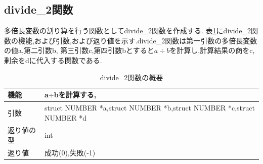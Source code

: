 \documentclass[a4j] {jarticle}
\begin{document}
\subsection{divide\_2関数}
多倍長変数の割り算を行う関数としてdivide\_2関数を作成する.
表\ref{divide_2}にdivide\_2関数の機能,および引数,および返り値を示す.divide\_2関数は第一引数の多倍長変数の値a,第二引数b,
第三引数c,第四引数bとすると$a\div b$を計算し,計算結果の商をc,剰余をdに代入する関数である.
\begin{table}[H]
  \caption{divide\_2関数の概要}
  \label{divide_2}
  \begin{center}
      \begin{tabular}{|l|l|}\hline
      機能 & a$\div$bを計算する,\\ \hline
      引数 & struct NUMBER *a,struct NUMBER *b,struct NUMBER *c,struct NUMBER *d\\ \hline
      返り値の型 & int\\ \hline
      返り値 & 成功(0),失敗(-1)\\ \hline
      \end{tabular}
  \end{center}
  \end{table}
\end{document}
